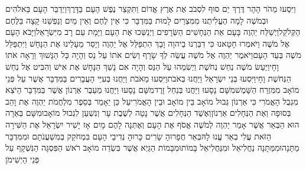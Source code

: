 \documentclass[../main/main.tex]{subfiles}
\begin{document}
\begin{multicols*}{\ncols}
וַיִּסְעוּ מֵהֹר הָהָר דֶּרֶךְ יַם סוּף לִסְבֹב אֶת אֶרֶץ אֱדוֹם וַתִּקְצַר נֶפֶשׁ הָעָם בַּדָּרֶךְ\PreVerseSpace{}וַיְדַבֵּר הָעָם בֵּאלֹהִים וּבְמֹשֶׁה לָמָה הֶעֱלִיתֻנוּ מִמִּצְרַיִם לָמוּת בַּמִּדְבָּר כִּי אֵין לֶחֶם וְאֵין מַיִם וְנַפְשֵׁנוּ קָצָה בַּלֶּחֶם הַקְּלֹקֵל\PreVerseSpace{}וַיְשַׁלַּח יַהְוֶה בָּעָם אֵת הַנְּחָשִׁים הַשְּׂרָפִים וַיְנַשְּׁכוּ אֶת הָעָם וַיָּמָת עַם רָב מִיִּשְׂרָאֵל\PreVerseSpace{}וַיָּבֹא הָעָם אֶל מֹשֶׁה וַיֹּאמְרוּ חָטָאנוּ כִּי דִבַּרְנוּ בַיהוָה וָבָךְ הִתְפַּלֵּל אֶל יַהְוֶה וְיָסֵר מֵעָלֵינוּ אֶת הַנָּחָשׁ וַיִּתְפַּלֵּל מֹשֶׁה בְּעַד הָעָם\PreVerseSpace{}וַיֹּאמֶר יַהְוֶה אֶל מֹשֶׁה עֲשֵׂה לְךָ שָׂרָף וְשִׂים אֹתוֹ עַל נֵס וְהָיָה כָּל הַנָּשׁוּךְ וְרָאָה אֹתוֹ וָחָי\PreVerseSpace{}וַיַּעַשׂ מֹשֶׁה נְחַשׁ נְחֹשֶׁת וַיְשִׂמֵהוּ עַל הַנֵּס וְהָיָה אִם נָשַׁךְ הַנָּחָשׁ אֶת אִישׁ וְהִבִּיט אֶל נְחַשׁ הַנְּחֹשֶׁת וָחָי\PreVerseSpace{}וַיִּסְעוּ בְּנֵי יִשְׂרָאֵל וַיַּחֲנוּ בְּאֹבֹת\PreVerseSpace{}וַיִּסְעוּ מֵאֹבֹת וַיַּחֲנוּ בְּעִיֵּי הָעֲבָרִים בַּמִּדְבָּר אֲשֶׁר עַל פְּנֵי מוֹאָב מִמִּזְרַח הַשָּׁמֶשׁ\PreVerseSpace{}מִשָּׁם נָסָעוּ וַיַּחֲנוּ בְּנַחַל זָרֶד\PreVerseSpace{}מִשָּׁם נָסָעוּ וַיַּחֲנוּ מֵעֵבֶר אַרְנוֹן אֲשֶׁר בַּמִּדְבָּר הַיֹּצֵא מִגְבֻל הָאֱמֹרִי כִּי אַרְנוֹן גְּבוּל מוֹאָב בֵּין מוֹאָב וּבֵין הָאֱמֹרִי\PreVerseSpace{}עַל כֵּן יֵאָמַר בְּסֵפֶר מִלְחֲמֹת יַהְוֶה אֶת וָהֵב בְּסוּפָה וְאֶת הַנְּחָלִים אַרְנוֹן\PreVerseSpace{}וְאֶשֶׁד הַנְּחָלִים אֲשֶׁר נָטָה לְשֶׁבֶת עָר וְנִשְׁעַן לִגְבוּל מוֹאָב\PreVerseSpace{}וּמִשָּׁם בְּאֵרָה הוּא הַבְּאֵר אֲשֶׁר אָמַר יַהְוֶה לְמֹשֶׁה אֱסֹף אֶת הָעָם וְאֶתְּנָה לָהֶם מָיִם \ClosedSection{}אָז יָשִׁיר יִשְׂרָאֵל אֶת הַשִּׁירָה הַזֹּאת עֲלִי בְאֵר עֱנוּ לָהּ\PreVerseSpace{}בְּאֵר חֲפָרוּהָ שָׂרִים כָּרוּהָ נְדִיבֵי הָעָם בִּמְחֹקֵק בְּמִשְׁעֲנֹתָם וּמִמִּדְבָּר מַתָּנָה\PreVerseSpace{}וּמִמַּתָּנָה נַחֲלִיאֵל וּמִנַּחֲלִיאֵל בָּמוֹת\PreVerseSpace{}וּמִבָּמוֹת הַגַּיְא אֲשֶׁר בִּשְׂדֵה מוֹאָב רֹאשׁ הַפִּסְגָּה הַנִּשְׁקָף\SubEnd{} עַל פְּנֵי הַיְשִׁימֹן\OpenSection{}\par

\end{multicols*}
\end{document}
